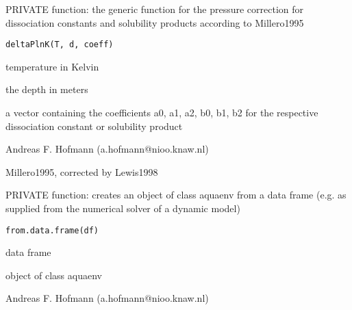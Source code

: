 \documentclass{article}
\begin{document}
\begin{Description}\relax
PRIVATE function: the generic function for the pressure correction for dissociation constants and solubility products according to Millero1995
\end{Description}
\begin{Usage}
\begin{verbatim}deltaPlnK(T, d, coeff)\end{verbatim}
\end{Usage}
\begin{Arguments}
\begin{ldescription}
\item[\code{T }] temperature in Kelvin
\item[\code{d }] the depth in meters
\item[\code{coeff }] a vector containing the coefficients a0, a1, a2, b0, b1, b2 for the respective dissociation constant or solubility product
\end{ldescription}
\end{Arguments}
\begin{Author}\relax
Andreas F. Hofmann (a.hofmann@nioo.knaw.nl)
\end{Author}
\begin{References}\relax
Millero1995, corrected by Lewis1998
\end{References}

\begin{Description}\relax
PRIVATE function: creates an object of class aquaenv from a data frame (e.g. as supplied from the numerical solver of a dynamic model)
\end{Description}
\begin{Usage}
\begin{verbatim}from.data.frame(df)\end{verbatim}
\end{Usage}
\begin{Arguments}
\begin{ldescription}
\item[\code{df }] data frame
\end{ldescription}
\end{Arguments}
\begin{Value}
object of class aquaenv
\end{Value}
\begin{Author}\relax
Andreas F. Hofmann (a.hofmann@nioo.knaw.nl)
\end{Author}
\end{document}
